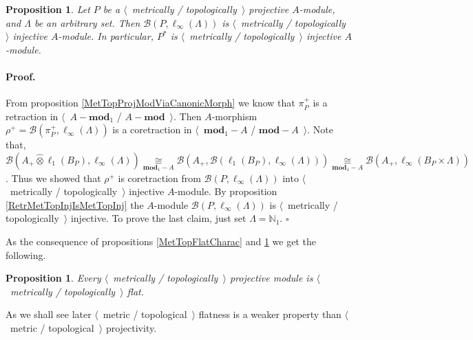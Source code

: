 \documentclass[12pt]{article}
\newcommand{\projtens}{\mathbin{\widehat{\otimes}}}
\newcommand{\isom}[1]{\mathop{\mathbin{\cong}}\limits_{#1}}
\newtheorem{proposition}[theorem]{Proposition}
\renewenvironment{proof}{\paragraph{Proof.}}{\hfill$\square$\medskip}
\begin{document}
\begin{proposition}\label{DualMetTopProjIsMetrInj} Let $P$ be a $\langle$~metrically / topologically~$\rangle$ projective $A$-module, and $\Lambda$ be an arbitrary set. Then $\mathcal{B}(P,\ell_\infty(\Lambda))$ is $\langle$~metrically / topologically~$\rangle$ injective $A$-module. In particular, $P^*$ is $\langle$~metrically / topologically~$\rangle$ injective $A$-module.
\end{proposition}
\begin{proof} From proposition \ref{MetTopProjModViaCanonicMorph} we know that $\pi_P^+$ is a retraction in $\langle$~$A-\mathbf{mod}_1$ / $A-\mathbf{mod}$~$\rangle$. Then $A$-morphism $\rho^+=\mathcal{B}(\pi_P^+,\ell_\infty(\Lambda))$ is a coretraction in $\langle$~$\mathbf{mod}_1-A$ / $\mathbf{mod}-A$~$\rangle$. Note that, $\mathcal{B}(A_+\projtens\ell_1(B_P),\ell_\infty(\Lambda))\isom{\mathbf{mod}_1-A}\mathcal{B}(A_+,\mathcal{B}(\ell_1(B_P),\ell_\infty(\Lambda)))\isom{\mathbf{mod}_1-A}\mathcal{B}(A_+,\ell_\infty(B_P\times\Lambda))$. Thus we showed that $\rho^+$ is coretraction from $\mathcal{B}(P,\ell_\infty(\Lambda))$ into $\langle$~metrically / topologically~$\rangle$ injective $A$-module. By proposition \ref{RetrMetTopInjIsMetTopInj} the $A$-module $\mathcal{B}(P,\ell_\infty(\Lambda))$ is $\langle$~metrically / topologically~$\rangle$ injective. To prove the last claim, just set $\Lambda=\mathbb{N}_1$.
\end{proof}

As the consequence of propositions \ref{MetTopFlatCharac} and \ref{DualMetTopProjIsMetrInj} we get the following.

\begin{proposition}\label{MetTopProjIsMetTopFlat} Every $\langle$~metrically / topologically~$\rangle$ projective module is $\langle$~metrically / topologically~$\rangle$ flat.
\end{proposition}

As we shall see later $\langle$~metric / topological~$\rangle$ flatness is a weaker property than $\langle$~metric / topological~$\rangle$ projectivity.
\end{document}
